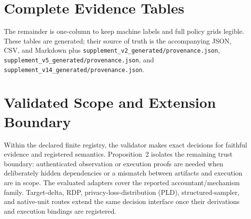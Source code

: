 \documentclass[letterpaper]{article} %
\begin{document}
\section{Complete Evidence Tables}
\label{sec:supp-complete-tables}

The remainder is one-column to keep machine labels and full policy grids
legible.  These tables are generated; their source of truth is the accompanying
JSON, CSV, and Markdown plus
\texttt{supplement\_v2\_generated/provenance.json},
\texttt{supplement\_v5\_generated/provenance.json}, and
\texttt{supplement\_v14\_generated/provenance.json}.

























\section{Validated Scope and Extension Boundary}
\label{sec:supp-limitations}

Within the declared finite registry, the validator makes exact decisions for
faithful evidence and registered semantics.  Proposition~2 isolates the
remaining trust boundary: authenticated observation or execution proofs are
needed when deliberately hidden dependencies or a mismatch between artifacts
and execution are in scope.  The evaluated adapters cover the reported
accountant/mechanism family.  Target-delta, RDP,
privacy-loss-distribution (PLD), structured-sampler, and native-unit routes
extend the same decision interface once their derivations and execution
bindings are registered.
\end{document}
